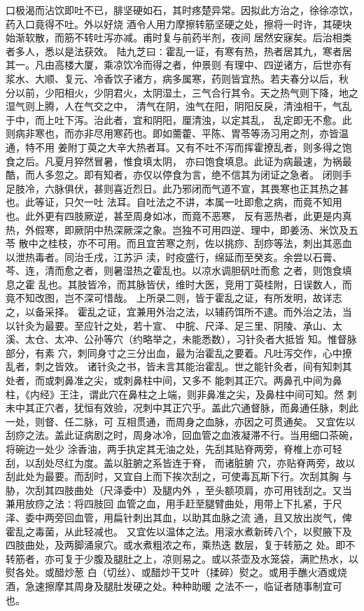 \documentclass[a4paper,12pt,UTF8,twoside]{ctexbook}
\begin{document}
口极渴而沾饮即吐不已，腓坚硬如石，其时疼楚异常。因拟此方治之，徐徐凉饮，药入口竟得不吐。外以好烧 
酒令人用力摩擦转筋坚硬之处，擦将一时许，其硬块始渐软散，而筋不转吐泻亦减。甫时复与前药半剂，夜间 
居然安寐矣。后治相类者多人，悉以是法获效。 
陆九芝曰∶霍乱一证，有寒有热，热者居其九，寒者居其一。凡由高楼大厦，乘凉饮冷而得之者，仲景则 
有理中、四逆诸方，后世亦有浆水、大顺、复元、冷香饮子诸方，病多属寒，药则皆宜热。若夫春分以后，秋 
分以前，少阳相火，少阴君火，太阴湿土，三气合行其令。天之热气则下降，地之湿气则上腾，人在气交之中， 
清气在阴，浊气在阳，阴阳反戾，清浊相干，气乱于中，而上吐下泻。治此者，宜和阴阳，厘清浊，以定其乱， 
乱定即无不愈。此则病非寒也，而亦非尽用寒药也。即如薷藿、平陈、胃苓等汤习用之剂，亦皆温通，特不用 
姜附丁萸之大辛大热者耳。又有不吐不泻而挥霍撩乱者，则多得之饱食之后。凡夏月猝然冒暑，惟食填太阴， 
亦曰饱食填息。此证为病最速，为祸最酷，而人多忽之。即有知者，亦仅以停食为言，绝不信其为闭证之急者。 
闭则手足肢冷，六脉俱伏，甚则喜近烈日。此乃邪闭而气道不宣，其畏寒也正其热之甚也。此等证，只欠一吐 
法耳。自吐法之不讲，本属一吐即愈之病，而竟不知用也。此外更有四肢厥逆，甚至周身如冰，而竟不恶寒， 
反有恶热者，此更是内真热，外假寒，即厥阴中热深厥深之象。岂独不可用四逆、理中，即姜汤、米饮及五苓 
散中之桂枝，亦不可用。而且宜苦寒之剂，佐以挑痧、刮痧等法，刺出其恶血以泄热毒者。同治壬戌，江苏沪 
渎，时疫盛行，绵延而至癸亥。余尝以石膏、芩、连，清而愈之者，则暑湿热之霍乱也。以凉水调胆矾吐而愈 
之者，则饱食填息之霍 
乱也。其肢皆冷，而其脉皆伏，维时大医，竞用丁萸桂附，日误数人，而竟不知改图，岂不深可惜哉。 
上所录二则，皆于霍乱之证，有所发明，故详志之，以备采择。 
霍乱之证，宜兼用外治之法，以辅药饵所不逮。而外治之法，当以针灸为最要。至应针之处，若十宣、 
中脘、尺泽、足三里、阴陵、承山、太溪、太仓、太冲、公孙等穴（约略举之，未能悉数），习针灸者大抵皆 
知。惟督脉部分，有素 穴，刺同身寸之三分出血，最为治霍乱之要着。凡吐泻交作，心中撩乱者，刺之皆效。 
诸针灸之书，皆未言其能治霍乱。世之能针灸者，间有知刺其处者，而或刺鼻准之尖，或刺鼻柱中间，又多不 
能刺其正穴。两鼻孔中间为鼻柱，《内经》王注，谓此穴在鼻柱之上端，则非鼻准之尖，及鼻柱中间可知。然 
刺未中其正穴者，犹恒有效验，况刺中其正穴乎。盖此穴通督脉，而鼻通任脉，刺此一处，则督、任二脉，可 
互相贯通，而周身之血脉，亦因之可贯通矣。 
又宜佐以刮痧之法。盖此证病剧之时，周身冰冷，回血管之血液凝滞不行。当用细口茶碗，将碗边一处少 
涂香油，两手执定其无油之处，先刮其贴脊两旁，脊椎上亦可轻刮，以刮处尽红为度。盖以脏腑之系皆连于脊， 
而诸脏腑 穴，亦贴脊两旁，故以刮此处为最要。而刮时，又宜自上而下挨次刮之，可使毒瓦斯下行。次刮其胸 
与胁，次刮其四肢曲处（尺泽委中）及腿内外 ，至头额项肩，亦可用钱刮之。又当兼用放痧之法∶将四肢回 
血管之血，用手赶至腿臂曲处，用带上下扎紧，于尺泽、委中两旁回血管，用扁针刺出其血，以助其血脉之流 
通，且又放出炭气，俾霍乱之毒菌，从此轻减也。 
又宜佐以温体之法。用滚水煮新砖八个，以熨腋下及四肢曲处，及两脚涌泉穴。或水煮粗浓之布，乘热迭 
数层，复于转筋之 
处。即不转筋者，亦可复于少腹及腿肚之上，凉则易之。或以茶壶及水笼袋，满贮热水，以熨各处。或醋炒葱 
白（切丝）、或醋炒干艾叶（揉碎）熨之。或用手醮火酒或烧酒，急速擦摩其周身及腿肚发硬之处。种种助暖 
之法不一，临证者随事制宜可也。 
\end{document}
